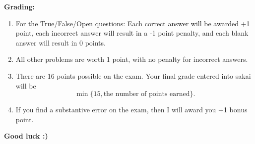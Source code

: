 \documentclass[10pt]{exam}
\theoremstyle{definition}
\begin{document}
\vspace{0.15in}
\noindent
\textbf{Grading:}
\begin{enumerate}
    \item For the True/False/Open questions: Each correct answer will be awarded +1 point, each incorrect answer will result in a -1 point penalty, and each blank answer will result in 0 points.

    \item All other problems are worth 1 point, with no penalty for incorrect answers.

    \item There are 16 points possible on the exam.
        Your final grade entered into sakai will be
        \begin{equation*}
            \min\{15, \text{the number of points earned}\}.
        \end{equation*}

    \item If you find a substantive error on the exam, then I will award you +1 bonus point.
\end{enumerate}

\vspace{0.15in}
\noindent
\textbf{Good luck :)}

\newpage
\end{document}
